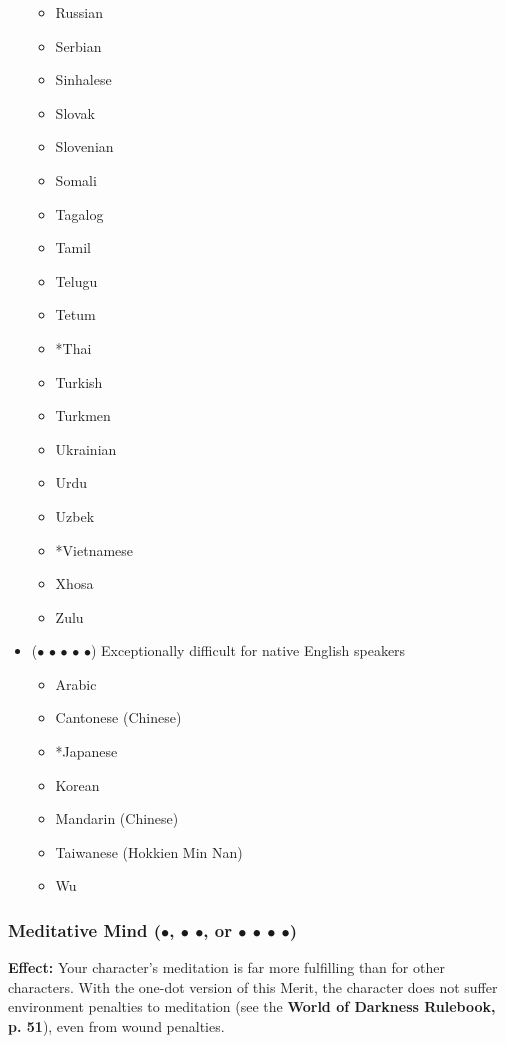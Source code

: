 \documentclass["../Misguided by Starlight.tex"]{subfiles}
\begin{document}
\begin{itemize}
\begin{itemize}
				\item Russian
				\item Serbian
				\item Sinhalese
				\item Slovak
				\item Slovenian
				\item Somali
				\item Tagalog
				\item Tamil
				\item Telugu
				\item Tetum
				\item *Thai
				\item Turkish
				\item Turkmen
				\item Ukrainian
				\item Urdu
				\item Uzbek
				\item *Vietnamese
				\item Xhosa
				\item Zulu
			\end{itemize}

			\item ($\bullet$ $\bullet$ $\bullet$ $\bullet$ $\bullet$) Exceptionally difficult for native English speakers
			\begin{itemize}
				\item Arabic
				\item Cantonese (Chinese)
				\item *Japanese
				\item Korean
				\item Mandarin (Chinese)
				\item Taiwanese (Hokkien Min Nan)
				\item Wu
			\end{itemize}
		\end{itemize}
	
	\subsubsection{Meditative Mind ($\bullet$, $\bullet$ $\bullet$, or $\bullet$ $\bullet$ $\bullet$ $\bullet$)} %
		\textbf{Effect:} Your character’s meditation is far more fulfilling than for other characters. With the one-dot version of this Merit, the character does not suffer environment penalties to meditation (see the \textbf{World of Darkness Rulebook, p. 51}), even from wound penalties.
		
\end{document}
